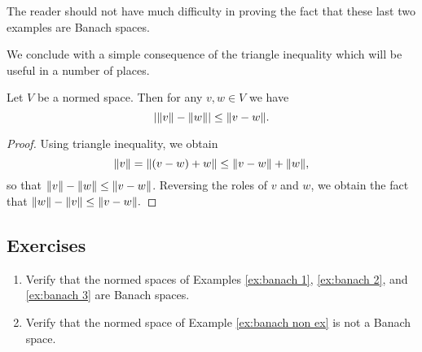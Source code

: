 The reader should not have much difficulty in proving the fact that these last two examples are Banach spaces.

We conclude with a simple consequence of the triangle inequality which will be useful in a number of places.

\begin{proposition}
Let $V$ be a normed space. Then for any $v,w\in V$ we have $$|\norm{v}-\norm{w}|\leq\norm{v-w}.$$
\end{proposition}

\begin{proof}
Using triangle inequality, we obtain $$\norm{v}=\norm{(v-w)+w}\leq\norm{v-w}+\norm{w},$$ so that $\norm{v}-\norm{w}\leq\norm{v-w}$. Reversing the roles of $v$ and $w$, we obtain the fact that $\norm{w}-\norm{v}\leq\norm{v-w}.$
\end{proof}

\subsection*{Exercises}
\begin{enumerate}[label=\arabic*)]
    \item Verify that the normed spaces of Examples \ref{ex:banach 1}, \ref{ex:banach 2}, and \ref{ex:banach 3} are Banach spaces.
    \item Verify that the normed space of Example \ref{ex:banach non ex} is not a Banach space.
\end{enumerate}